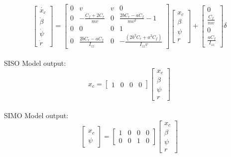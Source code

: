 \documentclass[a4paper, twocolumn]{article}
\begin{document}
\footnotesize
$$
\begin{bmatrix}
    \dot{x_{c}}
    \\
    \dot{\beta}
    \\
    \dot{\psi}
    \\  
    \dot{r}
\end{bmatrix}=
\begin{bmatrix}
    0 & v & v & 0 \\ 
    0 & -\frac{C_{f}+2C_{r}}{mv} & 0 & \frac{2bC_{r} - aC_{f}}{mv^{2}} -1 \\ 
    0 & 0 & 0 & 1 \\ 
    0 & \frac{2bC_{r} - aC_{f}}{I_{zz}} & 0 & -\frac{\left(2b^{2}C_{r} + a^{2}C_{f}\right)}{I_{zz}v} 
\end{bmatrix}
\begin{bmatrix}
    x_{c}
    \\
    \beta
    \\
    \psi
    \\  
    r
\end{bmatrix}+
\begin{bmatrix}
    0
    \\
    \frac{C_{f}}{mv}
    \\
    0
    \\  
    \frac{aC_{f}}{I_{zz}}
\end{bmatrix} \delta$$
\\

\normalsize
\noindent
SISO Model output:
\footnotesize
$$
x_{c}=
\begin{bmatrix}
    1&0&0&0
\end{bmatrix}
\begin{bmatrix}
    x_{c}
    \\
    \beta
    \\
    \psi
    \\  
    r
\end{bmatrix}
$$
\\

\normalsize
\noindent
SIMO Model output:
\footnotesize
$$ 
\begin{bmatrix}
    x_{c} 
    \\
    \psi   
\end{bmatrix}=
\begin{bmatrix}
    1&0&0&0
    \\
    0&0&1&0
\end{bmatrix}
\begin{bmatrix}
    x_{c}
    \\
    \beta
    \\
    \psi
    \\  
    r
\end{bmatrix}
$$

\normalsize


 
\end{document}

